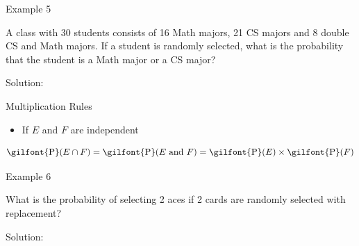 \documentclass[
  ignorenonframetext,
]{beamer}
\providecommand{\tightlist}{%
  \setlength{\itemsep}{0pt}\setlength{\parskip}{0pt}}
\begin{document}
\begin{frame}{Example 5}
\label{example-5}
\begin{tcolorbox}
A class with 30 students consists of 16 Math majors, 21 CS majors and 8 double CS and Math majors. If a student is randomly selected, what is the probability that the student is a Math major or a CS major?
\end{tcolorbox}

\begin{tcolorbox}
Solution:

\vspace{30mm}
\end{tcolorbox}
\end{frame}

\begin{frame}{Multiplication Rules}
\label{multiplication-rules}
\begin{itemize}
\tightlist
\item
  If \(E\) and \(F\) are independent
\end{itemize}

\[\textrm{\gilfont{P}}\normalfont (E \cap F) =\textrm{\gilfont{P}}\normalfont (E \text{ and } F)= \textrm{\gilfont{P}}\normalfont (E)\times \textrm{\gilfont{P}}\normalfont (F)\]
\end{frame}

\begin{frame}{Example 6}
\label{example-6}
\begin{tcolorbox}
What is the probability of selecting 2 aces if 2 cards are randomly selected with replacement?
\end{tcolorbox}

\begin{tcolorbox}
Solution:


\vspace{30mm}


\end{tcolorbox}
\end{frame}
\end{document}
